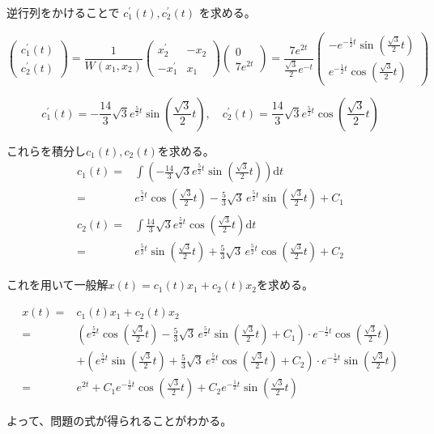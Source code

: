 \documentclass[12pt,b5paper]{ltjsarticle}
\begin{document}
逆行列をかけることで
$c_1^{\prime}(t), c_2^{\prime}(t)$
を求める。

\begin{equation}
 \begin{pmatrix}
  c_1^{\prime}(t) \\ c_2^{\prime}(t)
 \end{pmatrix}
 =
 \frac{1}{W(x_1,x_2)}
 \begin{pmatrix}
   x_2^{\prime} & -x_2\\
   -x_1^{\prime} & x_1
 \end{pmatrix}
 \begin{pmatrix}
  0 \\ 7e^{2t}
 \end{pmatrix}
 =
 \frac{7e^{2t}}{\frac{\sqrt{3}}{2}e^{-t} }
 \begin{pmatrix}
  -e^{-\frac{1}{2}t}\sin{\left(\frac{\sqrt{3}}{2}t\right)} \\
  e^{-\frac{1}{2}t}\cos{\left(\frac{\sqrt{3}}{2}t\right)}
 \end{pmatrix}
\end{equation}

\begin{equation}
  c_1^{\prime}(t)=
  -\frac{14}{3} \sqrt{3} e^{\frac{5}{2} t} \sin\left(\frac{\sqrt{3}}{2}t\right)
  ,\quad
  c_2^{\prime}(t)=
  \frac{14}{3} \sqrt{3} e^{\frac{5}{2}t} \cos\left(\frac{\sqrt{3}}{2}t\right)
\end{equation}

これらを積分し$c_1(t),c_2(t)$を求める。
\begin{align}
 c_1(t) =& \int \left(
-\frac{14}{3} \sqrt{3} e^{\frac{5}{2} t} \sin\left(\frac{\sqrt{3}}{2}t\right)
\right)\mathrm{d}t\\
 =&
 e^{\frac{5}{2}t} \cos\left(\frac{\sqrt{3}}{2}t\right)
 - \frac{5}{3}\sqrt{3}\, e^{\frac{5}{2}t} \sin\left(\frac{\sqrt{3}}{2}t\right)
 + C_1\\
 c_2(t) =& \int \frac{14}{3} \sqrt{3} e^{\frac{5}{2}t} \cos\left(\frac{\sqrt{3}}{2}t\right) \mathrm{d}t\\
 =&
 e^{\frac{5}{2}t} \sin\left(\frac{\sqrt{3}}{2}t\right)
+ \frac{5}{3}\sqrt{3}\, e^{\frac{5}{2}t} \cos\left(\frac{\sqrt{3}}{2}t\right)
 +C_2
\end{align}

これを用いて一般解$x(t)=c_1(t)x_1+c_2(t)x_2$を求める。

\begin{align}
 x(t)=& c_1(t)x_1+c_2(t)x_2\\
 =&
  \left(
 e^{\frac{5}{2}t} \cos\left(\frac{\sqrt{3}}{2}t\right)
 - \frac{5}{3}\sqrt{3}\, e^{\frac{5}{2}t} \sin\left(\frac{\sqrt{3}}{2}t\right)
 + C_1
      \right)
  \cdot
  e^{-\frac{1}{2}t}\cos{\left(\frac{\sqrt{3}}{2}t\right)}
\\
  & +
  \left(
 e^{\frac{5}{2}t} \sin\left(\frac{\sqrt{3}}{2}t\right)
+ \frac{5}{3}\sqrt{3}\, e^{\frac{5}{2}t} \cos\left(\frac{\sqrt{3}}{2}t\right)
 +C_2
\right)
\cdot
e^{-\frac{1}{2}t}\sin{\left(\frac{\sqrt{3}}{2}t\right)}\\
 =&
 e^{2t}
 +C_1 e^{-\frac{1}{2}t}\cos{\left(\frac{\sqrt{3}}{2}t\right)}
 +C_2 e^{-\frac{1}{2}t}\sin{\left(\frac{\sqrt{3}}{2}t\right)}
\end{align}

よって、問題の式が得られることがわかる。

\hrulefill
\end{document}
